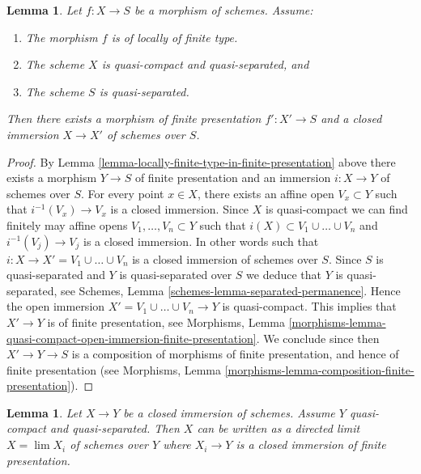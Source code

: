 \documentclass{stacks-project}
\theoremstyle{plain}
\newtheorem{lemma}[subsection]{Lemma}
\theoremstyle{definition}
\theoremstyle{remark}
\numberwithin{equation}{subsection}
\def\lim{\mathop{\mathrm{lim}}\nolimits}
\begin{document}
\begin{lemma}
\label{lemma-finite-type-closed-in-finite-presentation}
Let $f : X \to S$ be a morphism of schemes.
Assume:
\begin{enumerate}
\item The morphism $f$ is of locally of finite type.
\item The scheme $X$ is quasi-compact and quasi-separated, and
\item The scheme $S$ is quasi-separated.
\end{enumerate}
Then there exists a morphism of finite presentation
$f' : X' \to S$ and a closed immersion $X \to X'$ of schemes over $S$.
\end{lemma}

\begin{proof}
By Lemma \ref{lemma-locally-finite-type-in-finite-presentation} above
there exists a morphism $Y \to S$ of finite presentation and an
immersion $i : X \to Y$ of schemes over $S$.
For every point $x \in X$, there exists an affine open
$V_x \subset Y$ such that $i^{-1}(V_x) \to V_x$ is a
closed immersion. Since $X$ is quasi-compact we can find
finitely may affine opens $V_1, \ldots, V_n \subset Y$
such that $i(X) \subset V_1 \cup \ldots \cup V_n$ and
$i^{-1}(V_j) \to V_j$ is a closed immersion. In other words
such that $i : X \to X' = V_1 \cup \ldots \cup V_n$ is a
closed immersion of schemes over $S$.
Since $S$ is quasi-separated and $Y$ is quasi-separated over $S$
we deduce that $Y$ is quasi-separated, see
Schemes, Lemma \ref{schemes-lemma-separated-permanence}.
Hence the open immersion $X' = V_1 \cup \ldots \cup V_n \to Y$
is quasi-compact. This implies that
$X' \to Y$ is of finite presentation, see
Morphisms,
Lemma \ref{morphisms-lemma-quasi-compact-open-immersion-finite-presentation}.
We conclude since then $X' \to Y \to S$ is a composition of morphisms
of finite presentation, and hence of finite presentation (see
Morphisms, Lemma \ref{morphisms-lemma-composition-finite-presentation}).
\end{proof}

\begin{lemma}
\label{lemma-closed-is-limit-closed-and-finite-presentation}
Let $X \to Y$ be a closed immersion of schemes. Assume $Y$ quasi-compact and
quasi-separated. Then $X$ can be written as a directed limit $X = \lim X_i$
of schemes over $Y$ where $X_i \to Y$ is a closed immersion
of finite presentation.
\end{lemma}
\end{document}
